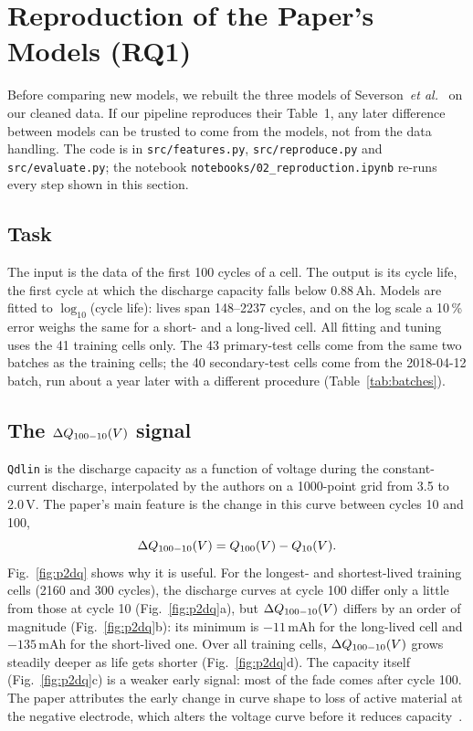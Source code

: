 \FloatBarrier
\section{Reproduction of the Paper's Models (RQ1)}
\label{sec:reproduction}

Before comparing new models, we rebuilt the three models of
Severson~\textit{et al.}~\cite{severson2019} on our cleaned data. If our
pipeline reproduces their Table~1, any later difference between models can be
trusted to come from the models, not from the data handling. The code is in
\texttt{src/features.py}, \texttt{src/reproduce.py} and
\texttt{src/evaluate.py}; the notebook \texttt{notebooks/02\_reproduction.ipynb}
re-runs every step shown in this section.

\subsection{Task}
The input is the data of the first 100 cycles of a cell. The output is its
cycle life, the first cycle at which the discharge capacity falls below
0.88\,Ah. Models are fitted to $\log_{10}$(cycle life): lives span
148--2237 cycles, and on the log scale a 10\,\% error weighs the same for
a short- and a long-lived cell. All fitting and tuning uses the 41 training
cells only. The 43 primary-test cells come from the same two batches as the
training cells; the 40 secondary-test cells come from the 2018-04-12 batch,
run about a year later with a different procedure (Table~\ref{tab:batches}).

\subsection{The $\Delta Q_{100-10}(V)$ signal}
\texttt{Qdlin} is the discharge capacity as a function of voltage during the
 constant-current discharge, interpolated by the authors on a
1000-point grid from 3.5 to 2.0\,V. The paper's main feature is the change
in this curve between cycles 10 and 100,
\begin{equation}
  \Delta Q_{100-10}(V) = Q_{100}(V) - Q_{10}(V).
\end{equation}
Fig.~\ref{fig:p2dq} shows why it is useful. For the longest- and
shortest-lived training cells (2160 and 300 cycles), the discharge curves at
cycle 100 differ only a little from those at cycle 10
(Fig.~\ref{fig:p2dq}a), but $\Delta Q_{100-10}(V)$ differs by an order of magnitude
(Fig.~\ref{fig:p2dq}b): its minimum is $-11$\,mAh for the long-lived cell and
$-135$\,mAh for the short-lived one. Over all training cells, $\Delta Q_{100-10}(V)$ grows
steadily deeper as life gets shorter (Fig.~\ref{fig:p2dq}d). The capacity
itself (Fig.~\ref{fig:p2dq}c) is a weaker early signal: most of the fade
comes after cycle 100. The paper attributes the early change in curve shape
to loss of active material at the negative electrode, which alters the
voltage curve before it reduces capacity~\cite{severson2019}.

